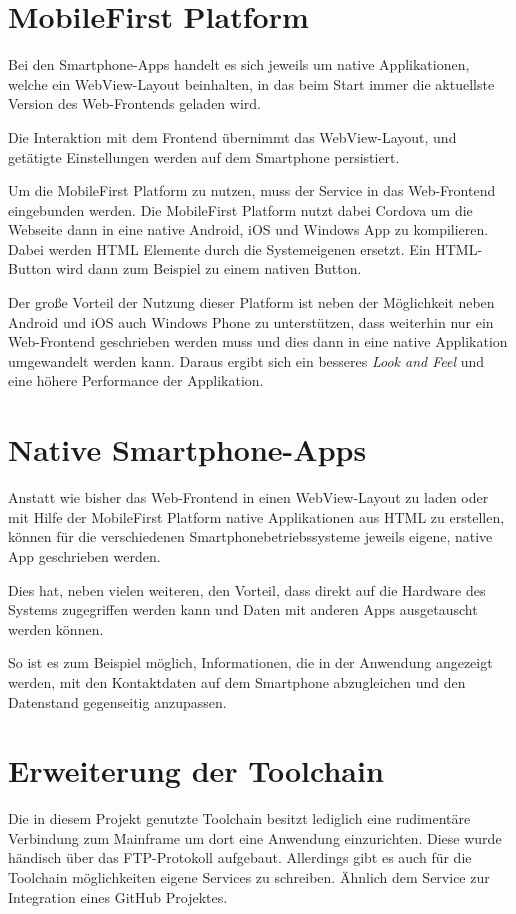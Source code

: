 \section{MobileFirst Platform}
Bei den Smartphone-Apps handelt es sich jeweils um native Applikationen, welche ein WebView-Layout beinhalten, in das beim
Start immer die aktuellste Version des Web-Frontends geladen wird.

Die Interaktion mit dem Frontend übernimmt das WebView-Layout, und getätigte Einstellungen werden auf dem Smartphone
persistiert.

Um die MobileFirst Platform zu nutzen, muss der Service in das Web-Frontend eingebunden werden. Die MobileFirst Platform
nutzt dabei Cordova um die Webseite dann in eine native Android, iOS und Windows App zu kompilieren. Dabei werden
HTML Elemente durch die Systemeigenen ersetzt. Ein HTML-Button wird dann zum Beispiel zu einem nativen Button.

Der große Vorteil der Nutzung dieser Platform ist neben der Möglichkeit neben Android und iOS auch Windows Phone zu
unterstützen, dass weiterhin nur ein Web-Frontend geschrieben werden muss und dies dann in eine native Applikation
umgewandelt werden kann. Daraus ergibt sich ein besseres \textit{Look and Feel} und eine höhere Performance
der Applikation.

\section{Native Smartphone-Apps}
Anstatt wie bisher das Web-Frontend in einen WebView-Layout zu laden oder mit Hilfe der MobileFirst Platform native Applikationen
aus HTML zu erstellen, können für die verschiedenen Smartphonebetriebssysteme jeweils eigene, native App geschrieben
werden.

Dies hat, neben vielen weiteren, den Vorteil, dass direkt auf die Hardware des Systems zugegriffen werden kann und Daten
mit anderen Apps ausgetauscht werden können.

So ist es zum Beispiel möglich, Informationen, die in der Anwendung angezeigt werden, mit den Kontaktdaten auf dem Smartphone
abzugleichen und den Datenstand gegenseitig anzupassen.

\section{Erweiterung der Toolchain}
\label{sec:erweiterung_der_toolchain}
Die in diesem Projekt genutzte Toolchain besitzt lediglich eine rudimentäre Verbindung zum Mainframe um dort eine Anwendung
einzurichten. Diese wurde händisch über das FTP-Protokoll aufgebaut. Allerdings gibt es auch für die Toolchain möglichkeiten
eigene Services zu schreiben. Ähnlich dem Service zur Integration eines GitHub Projektes.

